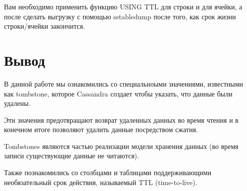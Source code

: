 Вам необходимо применить функцию USING TTL для строки и для
ячейки, а после сделать выгрузку с помощью sstabledump после того, как срок
жизни строки/ячейки закончится.

\clearpage

\section*{\LARGE Вывод}
В данной работе мы ознакомились со специальноыми значениями,
известными как tombstone, которое Cassandra создает чтобы указать,
что данные были удалены.\par
Эти значения предотвращают возврат удаленных данных во время чтения
и в конечном итоге позволяют удалить данные посредством сжатия.\par
Tombstones являются частью реализации модели хранения данных (во
время записи существующие данные не читаются).\par
Также познакомились со столбцами и таблицами поддерживающими
необязательный срок действия, называемый TTL (time-to-live).